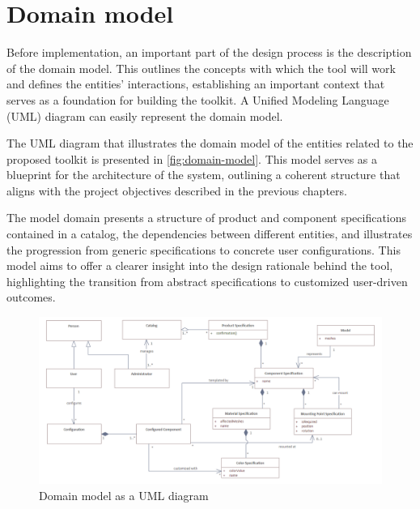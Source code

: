 \section{Domain model} \label{domain-model}

Before implementation, an important part of the design process is the description of the domain model. This outlines the concepts with which the tool will work and defines the entities' interactions, establishing an important context that serves as a foundation for building the toolkit. A Unified Modeling Language (UML) diagram can easily represent the domain model. \cite{Wlaschin2018}

The UML diagram that illustrates the domain model of the entities related to the proposed toolkit is presented in \autoref{fig:domain-model}. This model serves as a blueprint for the architecture of the system, outlining a coherent structure that aligns with the project objectives described in the previous chapters. 

The model domain presents a structure of product and component specifications contained in a catalog, the dependencies between different entities, and illustrates the progression from generic specifications to concrete user configurations. This model aims to offer a clearer insight into the design rationale behind the tool, highlighting the transition from abstract specifications to customized user-driven outcomes.

\begin{landscape}
\begin{figure}
\centering
\includegraphics[width=\linewidth]{images/uml_domainmodel.png}
\caption{Domain model as a UML diagram}
\label{fig:domain-model}
\end{figure}
\end{landscape}

